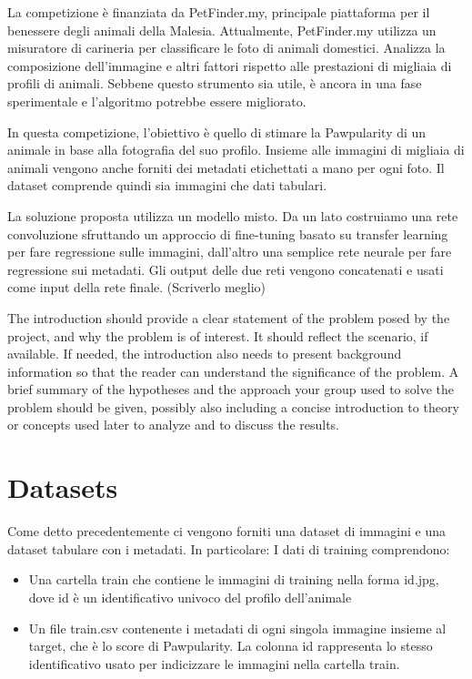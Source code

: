     La competizione è finanziata da PetFinder.my, principale piattaforma per il benessere degli animali della Malesia.
    Attualmente, PetFinder.my utilizza un misuratore di carineria per classificare le foto di animali domestici. Analizza la composizione dell'immagine e altri fattori rispetto alle prestazioni di migliaia di profili di animali. Sebbene questo strumento sia utile, è ancora in una fase sperimentale e l'algoritmo potrebbe essere migliorato.

    In questa competizione, l'obiettivo è quello di stimare la Pawpularity di un animale in base alla fotografia del suo profilo. Insieme alle immagini di migliaia di animali vengono anche forniti dei metadati etichettati a mano per ogni foto. Il dataset comprende quindi sia immagini che dati tabulari.

    La soluzione proposta utilizza un modello misto. Da un lato costruiamo una rete convoluzione sfruttando un approccio di fine-tuning basato su transfer learning per fare regressione sulle immagini, dall'altro una semplice rete neurale per fare regressione sui metadati. Gli output delle due reti vengono concatenati e usati come input della rete finale. (Scriverlo meglio)
    

    The introduction should provide a clear statement of the problem posed by the project, and why the problem is of interest. It should reflect the scenario, if available. If needed, the introduction also needs to present background information so that the reader can understand the significance of the problem. A brief summary of the hypotheses and the approach your group used to solve the problem should be given, possibly also including a concise introduction to theory or concepts used later to analyze and to discuss the results.


\section{Datasets}
    Come detto precedentemente ci vengono forniti una dataset di immagini e una dataset tabulare con i metadati.
    In particolare:
    I dati di training comprendono:
    \begin{itemize}
        \item Una cartella train che contiene le immagini di training nella forma {id}.jpg, dove {id} è un identificativo univoco del profilo dell'animale
        \item Un file train.csv contenente i metadati di ogni singola immagine insieme al target, che è lo score di Pawpularity. La colonna id rappresenta lo stesso identificativo usato per indicizzare le immagini nella cartella train.
    \end{itemize}

